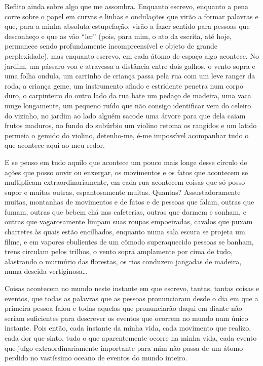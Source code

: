 Reflito ainda sobre algo que me assombra. Enquanto escrevo, enquanto a
pena corre sobre o papel em curvas e linhas e ondulações que virão a
formar palavras e que, para a minha absoluta estupefação, virão a fazer
sentido para pessoas que desconheço e que as vão ``ler'' (pois, para
mim, o ato da escrita, até hoje, permanece sendo profundamente
incompreensível e objeto de grande perplexidade), mas enquanto escrevo,
em cada átomo de espaço algo acontece. No jardim, um pássaro voa e
atravessa a distância entre dois galhos, o vento sopra e uma folha
ondula, um carrinho de criança passa pela rua com um leve ranger da
roda, a criança geme, um instrumento afiado e estridente penetra num
corpo duro, o carpinteiro do outro lado da rua bate um pedaço de
madeira, uma vaca muge longamente, um pequeno ruído que não consigo
identificar vem do celeiro do vizinho, no jardim ao lado alguém sacode
uma árvore para que dela caiam frutos maduros, no fundo do subúrbio um
violino retoma os rangidos e um latido permeia o gemido do violino,
detenho-me, é-me impossível acompanhar tudo o que acontece aqui ao meu
redor.

E se penso em tudo aquilo que acontece um pouco mais longe desse círculo
de ações que posso ouvir ou enxergar, os movimentos e os fatos que
acontecem se multiplicam extraordinariamente, em cada rua acontecem
coisas que só posso supor e muitas outras, espantosamente muitas.
Quantas? Assustadoramente muitas, montanhas de movimentos e de fatos e
de pessoas que falam, outras que fumam, outras que bebem chá nas
cafeterias, outras que dormem e sonham, e outras que vagarosamente
limpam suas roupas empoeiradas, cavalos que puxam charretes às quais
estão encilhados, enquanto numa sala escura se projeta um filme, e em
vapores ebulientes de um cômodo superaquecido pessoas se banham, trens
circulam pelos trilhos, o vento sopra amplamente por cima de tudo,
alastrando o murmúrio das florestas, os rios conduzem jangadas de
madeira, numa descida vertiginosa\ldots{}

Coisas acontecem no mundo neste instante em que escrevo, tantas, tantas
coisas e eventos, que todas as palavras que as pessoas pronunciaram
desde o dia em que a primeira pessoa falou e todas aquelas que
pronunciarão daqui em diante não seriam suficientes para descrever os
eventos que ocorrem no mundo num único instante. Pois então, cada
instante da minha vida, cada movimento que realizo, cada dor que sinto,
tudo o que aparentemente ocorre na minha vida, cada evento que julgo
extraordinariamente importante para mim não passa de um átomo perdido no
vastíssimo oceano de eventos do mundo inteiro.

